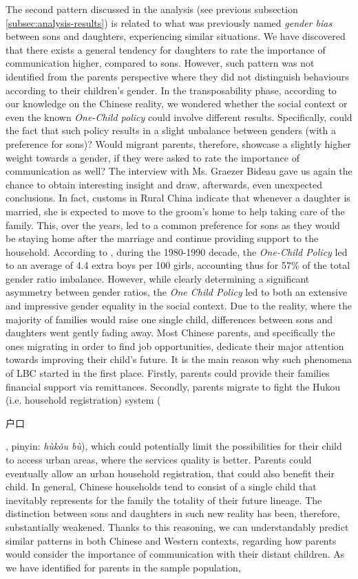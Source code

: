 The second pattern discussed in the analysis (see previous subsection \ref{subsec:analysis-results}) is related to what was previously named \textit{gender bias} between sons and daughters, experiencing similar situations. We have discovered that there exists a general tendency for daughters to rate the importance of communication higher, compared to sons. However, such pattern was not identified from the parents perspective where they did not distinguish behaviours according to their children's gender. In the transposability phase, according to our knowledge on the Chinese reality, we wondered whether the social context or even the known \textit{One-Child policy} could involve different results. Specifically, could the fact that such policy results in a slight unbalance between genders (with a preference for sons)? Would migrant parents, therefore, showcase a slightly higher weight towards a gender, if they were asked to rate the importance of communication as well? The interview with Ms. Graezer Bideau gave us again the chance to obtain interesting insight and draw, afterwards, even unexpected conclusions. In fact, customs in Rural China indicate that whenever a daughter is married, she is expected to move to the groom's home to help taking care of the family. This, over the years, led to a common preference for sons as they would be staying home after the marriage and continue providing support to the household. According to \cite{li2011estimating}, during the 1980-1990 decade, the \textit{One-Child Policy} led to an average of 4.4 extra boys per 100 girls, accounting thus for 57\% of the total gender ratio imbalance. However, while clearly determining a significant asymmetry between gender ratios, the \textit{One Child Policy} led to both an extensive and impressive gender equality in the social context. Due to the reality, where the majority of families would raise one single child, differences between sons and daughters went gently fading away. Most Chinese parents, and specifically the ones migrating in order to find job opportunities, dedicate their major attention towards improving their child's future. It is the main reason why such phenomena of LBC started in the first place. Firstly, parents could provide their families financial support via remittances. Secondly, parents migrate to fight the Hukou (i.e. household registration) system (\begin{CJK*}{UTF8}{gbsn}户口\end{CJK*}, pinyin: \textit{hùkǒu bù}), which could potentially limit the possibilities for their child to access urban areas, where the services quality is better. Parents could eventually allow an urban household registration, that could also benefit their child. In general, Chinese households tend to consist of a single child that inevitably represents for the family the totality of their future lineage. The distinction between sons and daughters in such new reality has been, therefore, substantially weakened. Thanks to this reasoning, we can understandably predict similar patterns in both Chinese and Western contexts, regarding how parents would consider the importance of communication with their distant children. As we have identified for parents in the sample population, 